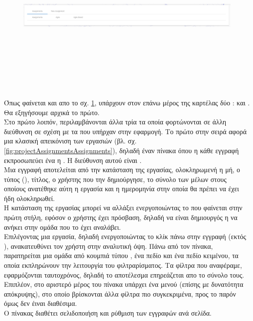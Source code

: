 \begin{figure}[!htb]
\includegraphics[width=\linewidth, height=8cm]{images/projectAssignments.png}
\caption{}
\label{fig:projectAssignments}
\end{figure}

\pSpace Όπως φαίνεται και απο το σχ. \ref{fig:projectAssignments}, υπάρχουν στον επάνω μέρος της καρτέλας δύο :  και . Θα εξηγήσουμε αρχικά το πρώτο.\\
\pSpace Στο πρώτο λοιπόν, περιλαμβάνονται άλλα τρία  τα οποία φορτώνονται σε άλλη διεύθυνση σε σχέση με τα  που υπήρχαν στην εφαρμογή. Το πρώτο στην σειρά αφορά μια κλασική απεικόνιση των εργασιών (βλ. σχ. \ref{fig:projectAssignmentsAssignments}), δηλαδή έναν πίνακα όπου η κάθε εγγραφή εκπροσωπεύει ένα  η . Η διεύθυνση αυτού είναι .\\
\pSpace Μια εγγραφή αποτελείται από την κατάσταση της εργασίας, ολοκληρωμενή η μή, ο τύπος (), τίτλος, ο χρήστης που την δημιούργησε, το σύνολο των μέλων στους οποίους ανατέθηκε αύτη η εργασία και η ημερομηνία στην οποία θα πρέπει να έχει ήδη ολοκληρωθεί.\\
\pSpace Η κατάσταση της εργασίας μπορεί να αλλάξει ενεργοποιώντας το  που φαίνεται στην πρώτη στήλη, εφόσον ο χρήστης έχει πρόσβαση, δηλαδή να είναι δημιουργός η να ανήκει στην ομάδα που το έχει αναλάβει.\\
\pSpace Επιλέγοντας μια εργασία, δηλαδή ενεργοποιώντας το κλίκ πάνω στην εγγραφή (εκτός ), ανακατευθύνει τον χρήστη στην αναλυτική όψη. \pSpace Πάνω από τον πίνακα, παρατηρείται μια ομάδα από κουμπιά τύπου , ένα πεδίο  και ένα πεδίο κειμένου, τα οποία εκπληρώνουν την λειτουργία του φιλτραρίσματος. Τα φίλτρα που αναφέραμε, εφαρμόζονται ταυτοχρόνος, δηλαδή το αποτέλεσμα επηρεάζεται απο το σύνολο τους.\\
\pSpace Επιπλέον, στο αριστερό μέρος του πίνακα υπάρχει ένα μενού (επίσης με δυνατότητα απόκρυψης), στο οποίο βρίσκονται άλλα φίλτρα πιο συγκεκριμένα, προς το παρόν όμως δεν έιναι διαθέσιμα.\\
\pSpace Ο πίνακας διαθέτει σελιδοποιήση και ρύθμιση των εγγραφών ανά σελίδα.

